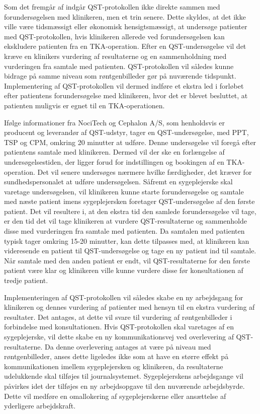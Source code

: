 Som det fremgår af  indgår QST-protokollen ikke direkte sammen med forundersøgelsen med klinikeren, men et trin senere. Dette skyldes, at det ikke ville være tidsmæssigt eller økonomisk hensigtsmæssigt, at undersøge patienter med QST-protokollen, hvis klinikeren allerede ved forundersøgelsen kan ekskludere patienten fra en TKA-operation. Efter en QST-undersøgelse vil det kræve en klinikers vurdering af resultaterne og en sammenholdning med vurderingen fra samtale med patienten. QST-protokollen vil således kunne bidrage på samme niveau som røntgenbilleder gør på nuværende tidspunkt. Implementering af QST-protokollen vil dermed indføre et ekstra led i forløbet efter patientens forundersøgelse med klinikeren, hvor det er blevet besluttet, at patienten muligvis er egnet til en TKA-operationen. 

Ifølge informationer fra NociTech og Cephalon A/S, som henholdsvis er producent og leverandør af QST-udstyr, tager en QST-undersøgelse, med PPT, TSP og CPM, omkring 20 minutter at udføre. Denne undersøgelse vil foregå efter patientens samtale med klinikeren. Dermed vil der ske en forlængelse af undersøgelsestiden, der ligger forud for indstillingen og bookingen af en TKA-operation. Det vil senere undersøges nærmere hvilke færdigheder, det kræver for sundhedspersonalet at udføre undersøgelsen. Såfremt en sygeplejerske skal varetage undersøgelsen, vil klinikeren kunne starte forundersøgelse og samtale med næste patient imens sygeplejersken foretager QST-undersøgelse af den første patient. Det vil resultere i, at den ekstra tid den samlede forundersøgelse vil tage, er den tid det vil tage klinikeren at vurdere QST-resultaterne og sammenholde disse med vurderingen fra samtale med patienten. Da samtalen med patienten typisk tager omkring 15-20 minutter,  kan dette tilpasses med, at klinikeren kan videresende en patient til QST-undersøgelse og tage en ny patient ind til samtale. Når samtale med den anden patient er endt, vil QST-resultaterne for den første patient være klar og klinikeren ville kunne vurdere disse før konsultationen af tredje patient.

Implementeringen af QST-protokollen vil således skabe en ny arbejdsgang for klinikeren og dennes vurdering af patienter med hensyn til en ekstra vurdering af resultater. Det antages, at dette vil svare til vurdering af røntgenbilleder i forbindelse med konsultationen. Hvis QST-protokollen skal varetages af en sygeplejerske, vil dette skabe en ny kommunikationsvej ved overlevering af QST-resultaterne. Da denne overlevering antages at være på niveau med røntgenbilleder, anses dette ligeledes ikke som at have en større effekt på kommunikationen imellem sygeplejersken og klinikeren, da resultaterne udelukkende skal tilføjes til journalsystemet. Sygeplejerskens arbejdsgange vil påvirkes idet der tilføjes en ny arbejdsopgave til den nuværende arbejdsbyrde. Dette vil medføre en omallokering af sygeplejerskerne eller ansættelse af yderligere arbejdskraft.

